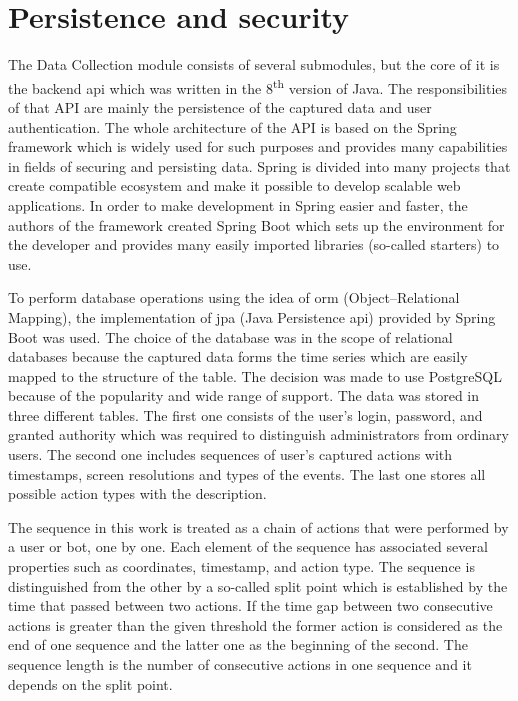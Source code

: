 \section{Persistence and security}\label{sec:persistence-and-security}
The Data Collection module consists of several submodules, but the core of it is the backend \gls{api} which was written in the 8\textsuperscript{th} version of Java.
The responsibilities of that API are mainly the persistence of the captured data and user authentication.
The whole architecture of the API is based on the Spring framework which is widely used for such purposes and provides many capabilities in fields of securing and persisting data.
Spring is divided into many projects that create compatible ecosystem and make it possible to develop scalable web applications.
In order to make development in Spring easier and faster, the authors of the framework created Spring Boot which sets up the environment for the developer and provides many easily imported libraries (so-called starters) to use.

To perform database operations using the idea of \gls{orm} (Object–Relational Mapping), the implementation of \gls{jpa} (Java Persistence \gls{api}) provided by Spring Boot was used.
The choice of the database was in the scope of relational databases because the captured data forms the time series which are easily mapped to the structure of the table.
The decision was made to use PostgreSQL because of the popularity and wide range of support.
The data was stored in three different tables.
The first one consists of the user's login, password, and granted authority which was required to distinguish administrators from ordinary users.
The second one includes sequences of user's captured actions with timestamps, screen resolutions and types of the events.
The last one stores all possible action types with the description.

The sequence in this work is treated as a chain of actions that were performed by a user or bot, one by one.
Each element of the sequence has associated several properties such as coordinates, timestamp, and action type.
The sequence is distinguished from the other by a so-called split point which is established by the time that passed between two actions.
If the time gap between two consecutive actions is greater than the given threshold the former action is considered as the end of one sequence and the latter one as the beginning of the second.
The sequence length is the number of consecutive actions in one sequence and it depends on the split point.

